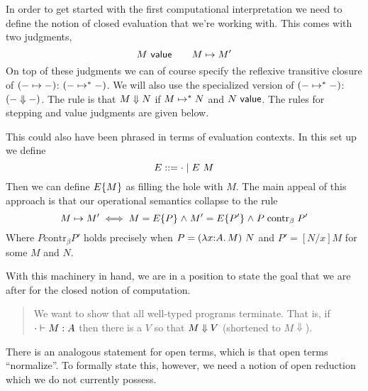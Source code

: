 \documentclass{article}
\begin{document}
In order to get started with the first computational interpretation we
need to define the notion of closed evaluation that we're working
with. This comes with two judgments,
\[
  M\ \mathsf{value} \qquad
  M \mapsto M'
\]
On top of these judgments we can of course specify the reflexive
transitive closure of $(- \mapsto -)$: $(- \mapsto^* -)$. We will also
use the specialized version of $(- \mapsto^* -)$: $(- \mathrel{\Downarrow} -)$. The
rule is that $M \mathrel{\Downarrow} N$ if $M \mapsto^* N$ and $N\ \mathsf{value}$. The
rules for stepping and value judgments are given below.
This could also have been phrased in terms of evaluation contexts. In
this set up we define
\[
  E ::= \cdot \mid E\ M
\]
Then we can define $E\{M\}$ as filling the hole with $M$. The
main appeal of this approach is that our operational semantics
collapse to the rule
\[
  M \mapsto M' \iff M = E\{P\} \mathrel{\wedge} M' = E\{P'\} \mathrel{\wedge} P \mathrel{\text{contr}_\beta} P'
\]
Where $P \mathrel{\text{contr}_\beta} P'$ holds precisely when
$P = (\lambda x {:} A.\, M)\ N$ and $P' = [N/x]M$ for some $M$ and $N$.

With this machinery in hand, we are in a position to state the goal
that we are after for the closed notion of computation.
\begin{quote}
  We want to show that all well-typed programs terminate. That is, if
  $\cdot \vdash M : A$ then there is a $V$ so that $M \mathrel{\Downarrow} V$
  (shortened to $M \Downarrow$).
\end{quote}
There is an analogous statement for open terms, which is that open
terms ``normalize''. To formally state this, however, we need a notion
of open reduction which we do not currently possess.
\end{document}
